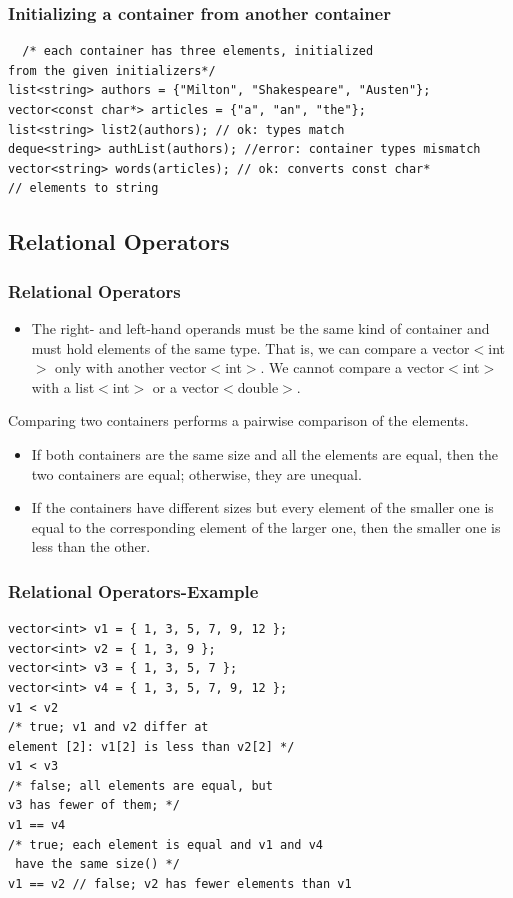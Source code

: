 \documentclass{beamer}
\newtheorem{Key points}{Key points}
\newcommand\Fontviaa{\fontsize{8}{7.2}\selectfont}
\begin{document}
\begin{frame}
  \frametitle{Initializing a container from another container}
\Fontviaa
\begin{lstlisting}
  /* each container has three elements, initialized 
from the given initializers*/
list<string> authors = {"Milton", "Shakespeare", "Austen"};
vector<const char*> articles = {"a", "an", "the"};
list<string> list2(authors); // ok: types match
deque<string> authList(authors); //error: container types mismatch
vector<string> words(articles); // ok: converts const char*
// elements to string

\end{lstlisting}
\end{frame}
\subsection{Relational Operators}
\begin{frame}
  \frametitle{Relational Operators}
  \begin{itemize}
  \item  The right- and left-hand operands must be the same kind of container
and must hold elements of the same type. That is, we can compare a vector$<$int$>$ only with another vector$<$int$>$. We cannot compare a vector$<$int$>$ with a
list$<$int$>$ or a vector$<$double$>$.
  \end{itemize}
Comparing two containers performs a pairwise comparison of the elements. 
\begin{itemize}
\item  If both containers are the same size and all the elements are equal, then the
two containers are equal; otherwise, they are unequal.
\item  If the containers have different sizes but every element of the smaller one is
equal to the corresponding element of the larger one, then the smaller one is
less than the other.
\end{itemize}
\end{frame} 
\begin{frame}[fragile]
  \frametitle{Relational Operators-Example}
\begin{lstlisting}
vector<int> v1 = { 1, 3, 5, 7, 9, 12 };
vector<int> v2 = { 1, 3, 9 };
vector<int> v3 = { 1, 3, 5, 7 };
vector<int> v4 = { 1, 3, 5, 7, 9, 12 };
v1 < v2 
/* true; v1 and v2 differ at 
element [2]: v1[2] is less than v2[2] */
v1 < v3 
/* false; all elements are equal, but 
v3 has fewer of them; */
v1 == v4 
/* true; each element is equal and v1 and v4
 have the same size() */
v1 == v2 // false; v2 has fewer elements than v1
\end{lstlisting}
\end{frame}
\end{document}
